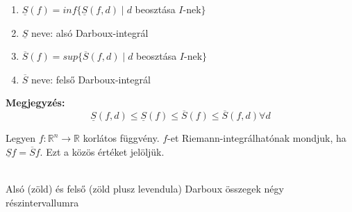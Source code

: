 \documentclass[11pt,a4paper]{article}
\begin{document}
\begin{tcolorbox}[colback=blue!5!white,colframe=blue!70!black,title= 9. Riemann-integrálhatóság (alsó-felső Darboux-integrál)]
\begin{enumerate}
    \item \(\underline{S}(f) = inf\{\underline{S}(f,d)\mid d\) beosztása \(I\)-nek\(\}\)
    \item \(\underline{S}\) neve: alsó Darboux-integrál
    \item \(\overline{S}(f) = sup\{\overline{S}(f,d)\mid d\) beosztása \(I\)-nek\(\}\)
    \item \(\overline{S}\) neve: felső Darboux-integrál
\end{enumerate}
\textbf{Megjegyzés:}
$$\underline{S}(f,d) \leq \underline{S}(f) \leq \overline{S}(f) \leq \overline{S}(f,d) \forall d $$

Legyen \(f : \mathbb{R}^n \to \mathbb{R}\) korlátos függvény. \(f\)-et Riemann-integrálhatónak mondjuk, ha \(\underline{S}f = \overline{S}f\). Ezt a közös értéket
jelöljük.\\
\begin{center}
    \\
    Alsó (zöld) és felső (zöld plusz levendula) Darboux összegek négy részintervallumra
\end{center}
\end{tcolorbox}
\end{document}

